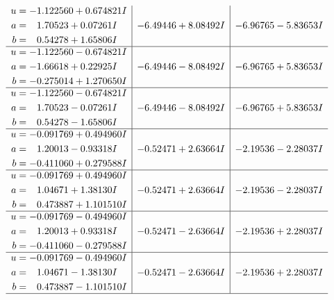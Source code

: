 \documentclass[1p]{elsarticle_modified}
\theoremstyle{definition}
\begin{document}
$$\begin{array}{c|c|c}
\begin{aligned}
u &= -1.122560 + 0.674821 I \\
a &= \phantom{-}1.70523 + 0.07261 I \\
b &= \phantom{-}0.54278 + 1.65806 I\end{aligned}
 & -6.49446 + 8.08492 I & -6.96765 - 5.83653 I \\ \hline\begin{aligned}
u &= -1.122560 - 0.674821 I \\
a &= -1.66618 + 0.22925 I \\
b &= -0.275014 + 1.270650 I\end{aligned}
 & -6.49446 - 8.08492 I & -6.96765 + 5.83653 I \\ \hline\begin{aligned}
u &= -1.122560 - 0.674821 I \\
a &= \phantom{-}1.70523 - 0.07261 I \\
b &= \phantom{-}0.54278 - 1.65806 I\end{aligned}
 & -6.49446 - 8.08492 I & -6.96765 + 5.83653 I \\ \hline\begin{aligned}
u &= -0.091769 + 0.494960 I \\
a &= \phantom{-}1.20013 - 0.93318 I \\
b &= -0.411060 + 0.279588 I\end{aligned}
 & -0.52471 + 2.63664 I & -2.19536 - 2.28037 I \\ \hline\begin{aligned}
u &= -0.091769 + 0.494960 I \\
a &= \phantom{-}1.04671 + 1.38130 I \\
b &= \phantom{-}0.473887 + 1.101510 I\end{aligned}
 & -0.52471 + 2.63664 I & -2.19536 - 2.28037 I \\ \hline\begin{aligned}
u &= -0.091769 - 0.494960 I \\
a &= \phantom{-}1.20013 + 0.93318 I \\
b &= -0.411060 - 0.279588 I\end{aligned}
 & -0.52471 - 2.63664 I & -2.19536 + 2.28037 I \\ \hline\begin{aligned}
u &= -0.091769 - 0.494960 I \\
a &= \phantom{-}1.04671 - 1.38130 I \\
b &= \phantom{-}0.473887 - 1.101510 I\end{aligned}
 & -0.52471 - 2.63664 I & -2.19536 + 2.28037 I\\
 \hline 
 \end{array}$$\newpage\newpage\renewcommand{\arraystretch}{1}
\end{document}
